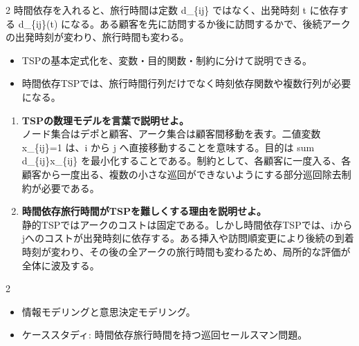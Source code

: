 \begin{multicols}{2}
時間依存を入れると、旅行時間は定数 d\_\{ij\} ではなく、出発時刻 t に依存する d\_\{ij\}(t) になる。ある顧客を先に訪問するか後に訪問するかで、後続アークの出発時刻が変わり、旅行時間も変わる。\par
{}
\begin{itemize}
\item TSPの基本定式化を、変数・目的関数・制約に分けて説明できる。
\item 時間依存TSPでは、旅行時間行列だけでなく時刻依存関数や複数行列が必要になる。
\end{itemize}
\begin{enumerate}
\item \textbf{TSPの数理モデルを言葉で説明せよ。}\\ノード集合はデポと顧客、アーク集合は顧客間移動を表す。二値変数 x\_\{ij\}=1 は、i から j へ直接移動することを意味する。目的は sum d\_\{ij\}x\_\{ij\} を最小化することである。制約として、各顧客に一度入る、各顧客から一度出る、複数の小さな巡回ができないようにする部分巡回除去制約が必要である。
\item \textbf{時間依存旅行時間がTSPを難しくする理由を説明せよ。}\\静的TSPではアークのコストは固定である。しかし時間依存TSPでは、iからjへのコストが出発時刻に依存する。ある挿入や訪問順変更により後続の到着時刻が変わり、その後の全アークの旅行時間も変わるため、局所的な評価が全体に波及する。
\end{enumerate}
\end{multicols}

\clearpage
{}
\begin{multicols}{2}\scriptsize\raggedcolumns
{}
\begin{itemize}
\item 情報モデリングと意思決定モデリング。
\item ケーススタディ: 時間依存旅行時間を持つ巡回セールスマン問題。
\end{itemize}
\end{multicols}

